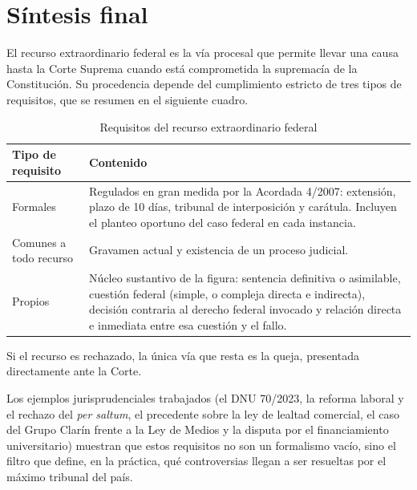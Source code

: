 \documentclass[12pt,oneside]{book}
\begin{document}
\chapter[Síntesis final]{Síntesis final}

El recurso extraordinario federal es la vía procesal que permite llevar una causa hasta la Corte Suprema cuando está comprometida la supremacía de la Constitución. Su procedencia depende del cumplimiento estricto de tres tipos de requisitos, que se resumen en el siguiente cuadro.

\begin{table}[H]
\centering
\begin{tabularx}{\textwidth}{@{}>{\raggedright\arraybackslash}p{}>{\raggedright\arraybackslash}X@{}}
\toprule
\textbf{Tipo de requisito} & \textbf{Contenido} \\
\midrule
Formales &
Regulados en gran medida por la Acordada 4/2007: extensión, plazo de 10 días, tribunal de interposición y carátula. Incluyen el planteo oportuno del caso federal en cada instancia. \\
\addlinespace[0.4em]
Comunes a todo recurso &
Gravamen actual y existencia de un proceso judicial. \\
\addlinespace[0.4em]
Propios &
Núcleo sustantivo de la figura: sentencia definitiva o asimilable, cuestión federal (simple, o compleja directa e indirecta), decisión contraria al derecho federal invocado y relación directa e inmediata entre esa cuestión y el fallo. \\
\bottomrule
\end{tabularx}
\caption{Requisitos del recurso extraordinario federal}
\end{table}

Si el recurso es rechazado, la única vía que resta es la queja, presentada directamente ante la Corte.

Los ejemplos jurisprudenciales trabajados (el DNU 70/2023, la reforma laboral y el rechazo del \textit{per saltum}, el precedente sobre la ley de lealtad comercial, el caso del Grupo Clarín frente a la Ley de Medios y la disputa por el financiamiento universitario) muestran que estos requisitos no son un formalismo vacío, sino el filtro que define, en la práctica, qué controversias llegan a ser resueltas por el máximo tribunal del país.
\end{document}
